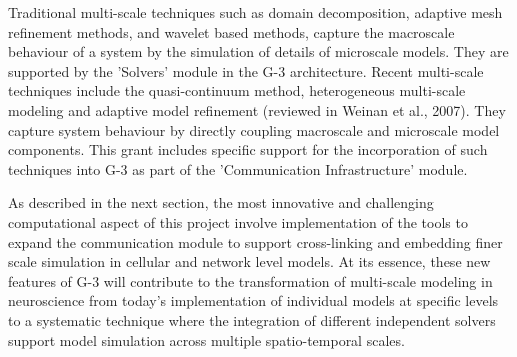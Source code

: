 \documentclass[12pt]{article}
\begin{document}
Traditional multi-scale techniques such as 
domain decomposition, adaptive mesh refinement methods, and wavelet
based methods, capture the macroscale behaviour of a system by the
simulation of details of microscale models.  They are supported by the
'Solvers' module in the G-3 architecture.  Recent multi-scale
techniques include the quasi-continuum method, heterogeneous
multi-scale modeling and adaptive model refinement (reviewed in Weinan
et al., 2007).  They capture system behaviour by directly coupling
macroscale and microscale model components.  This grant includes
specific support for the incorporation of such techniques into G-3 as
part of the 'Communication Infrastructure' module.

As described in the next section, the most innovative and challenging
computational aspect of this project involve implementation of the
tools to expand the communication module to support cross-linking and
embedding finer scale simulation in cellular and network level models.
At its essence, these new features of G-3 will contribute to the
transformation of multi-scale modeling in neuroscience from today's
implementation of individual models at specific levels to a systematic
technique where the integration of different independent solvers
support model simulation across multiple spatio-temporal scales.


\end{document}
